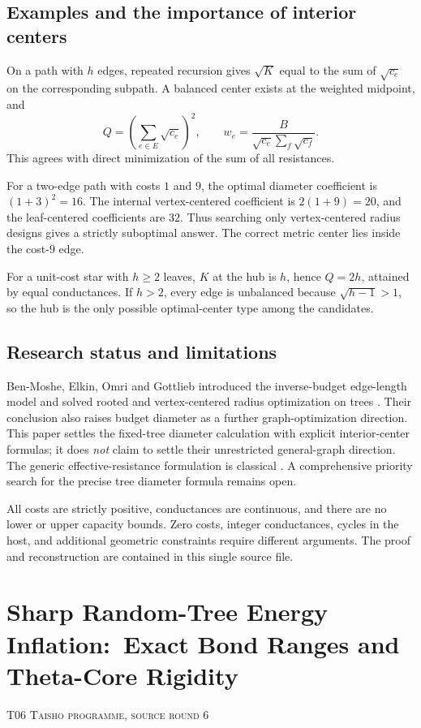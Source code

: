 \documentclass[11pt,a4paper]{article}
\theoremstyle{definition}\newtheorem{definition}[theorem]{Definition}
\theoremstyle{remark}\newtheorem{remark}[theorem]{Remark}
\numberwithin{equation}{section}
\begin{document}
\subsection{Examples and the importance of interior centers}\label{T05-sec-5}
On a path with $h$ edges, repeated recursion gives $\sqrt{K}$ equal to the sum of $\sqrt{c_e}$ on the corresponding subpath. A balanced center exists at the weighted midpoint, and
\[
 Q=\left(\sum_{e\in E}\sqrt{c_e}\right)^2,\qquad
 w_e=\frac{B}{\sqrt{c_e}\sum_f\sqrt{c_f}}.
\]
This agrees with direct minimization of the sum of all resistances.

For a two-edge path with costs $1$ and $9$, the optimal diameter coefficient is $(1+3)^2=16$. The internal vertex-centered coefficient is $2(1+9)=20$, and the leaf-centered coefficients are $32$. Thus searching only vertex-centered radius designs gives a strictly suboptimal answer. The correct metric center lies inside the cost-$9$ edge.

For a unit-cost star with $h\ge2$ leaves, $K$ at the hub is $h$, hence $Q=2h$, attained by equal conductances. If $h>2$, every edge is unbalanced because $\sqrt{h-1}>1$, so the hub is the only possible optimal-center type among the candidates.

\subsection{Research status and limitations}\label{T05-sec-6}
Ben-Moshe, Elkin, Omri and Gottlieb introduced the inverse-budget edge-length model and solved rooted and vertex-centered radius optimization on trees \cite{ref044}. Their conclusion also raises budget diameter as a further graph-optimization direction. This paper settles the fixed-tree diameter calculation with explicit interior-center formulas; it does \emph{not} claim to settle their unrestricted general-graph direction. The generic effective-resistance formulation is classical \cite{ref036}. A comprehensive priority search for the precise tree diameter formula remains open.

All costs are strictly positive, conductances are continuous, and there are no lower or upper capacity bounds. Zero costs, integer conductances, cycles in the host, and additional geometric constraints require different arguments. The proof and reconstruction are contained in this single source file.




\clearpage
\section[T06 --- Sharp Random-Tree Energy Inflation:\ Exact Bond Ranges and Theta-Core Rigidity]{Sharp Random-Tree Energy Inflation:\ Exact Bond Ranges and Theta-Core Rigidity}\label{contrib-T06}
\noindent\textsc{T06 \quad Taisho programme, source round 6}\par\medskip
\end{document}
